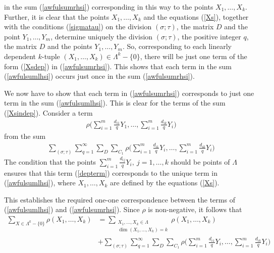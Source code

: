 \documentclass[11pt]{article}
\theoremstyle{definition}
\theoremstyle{proof}
\begin{document}
in the sum (\ref{awfulsumrhsi}) corresponding in this way to the points $X_1, \ldots, X_k$.
Further, it is clear that the points $X_1, \ldots, X_k$ and the equations (\ref{Xs}), together with the conditions (\ref{sigmatau}) on the division $(\sigma ; \tau )$, the matrix $D$ and the point $Y_1, \ldots, Y_m$, determine uniquely the division $(\sigma ; \tau )$, the positive integer $q$, the matrix $D$ and the points $Y_1, \ldots, Y_m$.
So, corresponding to each linearly dependent $k$-tuple $(X_1, \ldots, X_k) \in \Lambda ^k - \{0\}$, there will be just one term of the form (\ref{Xsdep}) in (\ref{awfulsumrhsi}).
This shows that each term in the sum (\ref{awfulsumlhsi}) occurs just once in the sum (\ref{awfulsumrhsi}).

We now have to show that each term in (\ref{awfulsumrhsi}) corresponds to just one term in the sum (\ref{awfulsumlhsi}).
This is clear for the terms of the sum (\ref{Xsindep}).
Consider a term
\begin{align}\label{depterm}
    \rho \bigg(\sum\limits_{i=1}^{m}\frac{d_{i1}}{q}Y_1, \ldots, \sum\limits_{i=1}^{m}\frac{d_{ik}}{q}Y_i\bigg)
\end{align}
from the sum
\begin{align*}
    \sum_{(\sigma ; \tau )}\sum_{q = 1}^{\infty} \sum_{D} \sum_{C_1} \rho \bigg(\sum_{i=1}^{m}\frac{d_{i1}}{q}Y_i, \ldots, \sum_{i=1}^{m}\frac{d_{ik}}{q}Y_i \bigg)
\end{align*}
The condition that the points $\sum\limits_{i=1}^{m}\frac{d_{ij}}{q}Y_i, \ j=1, \ldots, k$ should be points of $\Lambda$ ensures that this term (\ref{depterm}) corresponds to the unique term in (\ref{awfulsumlhsi}), where $X_1, \ldots, X_k$ are defined by the equations (\ref{Xs}).

This establishes the required one-one correspondence between the terms of (\ref{awfulsumlhsi}) and (\ref{awfulsumrhsi}).
Since $\rho$ is non-negative, it follows that
\begin{equation}\label{awfulsumi}
    \begin{split}
        \sum_{X \in \Lambda ^k - \{0\}} \rho(X_1, \ldots, X_k) &= \sum_{\substack{X_1, \ldots, X_k \in \Lambda \\ \dim (X_1, \ldots, X_k) = k}} \rho(X_1, \ldots, X_k) \\
        &+ \sum_{(\sigma ; \tau )}\sum_{q = 1}^{\infty} \sum_{D} \sum_{C_1} \rho\bigg(\sum_{i=1}^{m}\frac{d_{i1}}{q}Y_i, \ldots, \sum_{i=1}^{m}\frac{d_{ik}}{q}Y_i \bigg)
    \end{split}
\end{equation}
\end{document}
